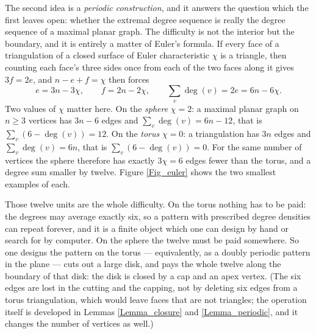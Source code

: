 \documentclass[12pt,a4paper]{article}%
\begin{document}
The second idea is a \emph{periodic construction}, and it answers the question which the first leaves
open: whether the extremal degree sequence is really the degree sequence of a maximal planar graph. The
difficulty is not the interior but the boundary, and it is entirely a matter of Euler's formula. If
every face of a triangulation of a closed surface of Euler characteristic $\chi $ is a triangle, then
counting each face's three sides once from each of the two faces along it gives $3f=2e$, and $n-e+f=\chi $
then forces
\[
e=3n-3\chi ,\qquad f=2n-2\chi ,\qquad \sum_{v}\deg (v)=2e=6n-6\chi .
\]
Two values of $\chi $ matter here. On the \emph{sphere} $\chi =2$: a maximal planar graph on $n\geq 3$
vertices has $3n-6$ edges and $\sum_{v}\deg (v)=6n-12$, that is $\sum_{v}(6-\deg (v))=12$. On the
\emph{torus} $\chi =0$: a triangulation has $3n$ edges and $\sum_{v}\deg (v)=6n$, that is
$\sum_{v}(6-\deg (v))=0$. For the same number of vertices the sphere therefore has exactly
$3\chi =6$ edges fewer than the torus, and a degree sum smaller by twelve. Figure \ref{Fig_euler} shows the
two smallest examples of each.

Those twelve units are the whole difficulty. On the torus nothing has to be paid: the degrees may average
exactly six, so a pattern with prescribed degree densities can repeat forever, and it is a finite object
which one can design by hand or search for by computer. On the sphere the twelve must be paid somewhere. So
one designs the pattern on the torus --- equivalently, as a doubly periodic pattern in the plane --- cuts out
a large disk, and pays the whole twelve along the boundary of that disk: the disk is closed by a cap and an
apex vertex. (The six edges are lost in the cutting and the capping, not by deleting six edges from a torus
triangulation, which would leave faces that are not triangles; the operation itself is developed in Lemmas
\ref{Lemma_closure} and \ref{Lemma_periodic}, and it changes the number of vertices as well.) 
\end{document}

